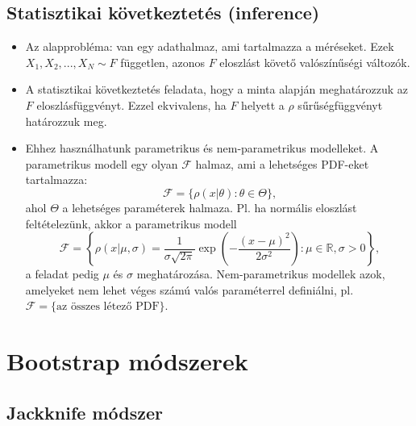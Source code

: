 \documentclass[12pt]{article}
\theoremstyle{plain}
\begin{document}
\subsection{Statisztikai következtetés (inference)}
\begin{itemize}
    \item Az alapprobléma: van egy adathalmaz, ami tartalmazza a méréseket. Ezek $X_1, X_2, ..., X_N \sim F$ független, 
    azonos $F$ eloszlást követő valószínűségi változók.
    \item A statisztikai következtetés feladata, hogy a minta alapján meghatározzuk az $F$ eloszlásfüggvényt. Ezzel ekvivalens,
    ha $F$ helyett a $\rho$ sűrűségfüggvényt határozzuk meg.
    \item Ehhez használhatunk parametrikus és nem-parametrikus modelleket. A parametrikus modell egy olyan $\mathcal F$ halmaz, 
    ami a lehetséges PDF-eket tartalmazza:
    \begin{equation*}
        \mathcal F = \{\rho(x|\theta) : \theta \in \Theta\}\text{,}
    \end{equation*}
    ahol $\Theta$ a lehetséges paraméterek halmaza. Pl. ha normális eloszlást feltételezünk, akkor a parametrikus modell
    \begin{equation*}
        \mathcal F = \left\{\rho(x|\mu, \sigma) = \frac{1}{\sigma\sqrt{2\pi}}\exp\left(-\frac{(x-\mu)^2}{2\sigma^2}\right) : \mu\in\mathbb R, \sigma>0 \right\}\text{,}
    \end{equation*}
    a feladat pedig $\mu$ és $\sigma$ meghatározása. Nem-parametrikus modellek azok, amelyeket nem lehet véges számú valós paraméterrel
    definiálni, pl. $\mathcal F = \{\text{az összes létező PDF}\}$.
\end{itemize}

\section{Bootstrap módszerek}

\subsection{Jackknife módszer}
\end{document}
